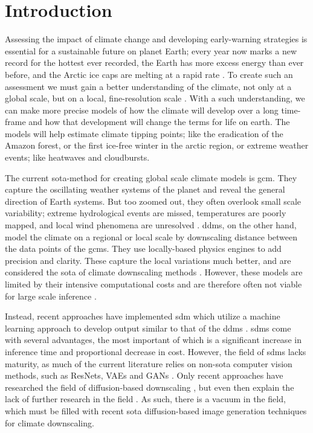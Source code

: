 \chapter{Introduction}
Assessing the impact of climate change and developing early-warning strategies is essential for a sustainable future on planet Earth; every year now marks a new record for the hottest ever recorded, the Earth has more excess energy than ever before, and the Arctic ice caps are melting at a rapid rate \cite{un-climate}. To create such an assessment we must gain a better understanding of the climate, not only at a global scale, but on a local, fine-resolution scale \cite{hclim-fennoscandinavia} \cite{precip-temp-downscaling-cnn} \cite{precip-downscaling} \cite{icyalert-article} \cite{review-ml-downscaling}. 
With a such understanding, we can make more precise models of how the climate will develop over a long time-frame and how that development will change the terms for life on earth. The models will help estimate climate tipping points; like the eradication of the Amazon forest, or the first ice-free winter in the arctic region, or extreme weather events; like heatwaves and cloudbursts. 

The current \gls{sota}-method for creating global scale climate models is \gls{gcm}. They capture the oscillating weather systems of the planet and reveal the general direction of Earth systems. But too zoomed out, they often overlook small scale variability; extreme hydrological events are missed, temperatures are poorly mapped, and local wind phenomena are unresolved \cite{precip-downscaling} \cite{temp-downscaling-rnn}. \Glspl{ddm}, on the other hand, model the climate on a regional or local scale by \gls{downscaling} distance between the data points of the \glspl{gcm}. They use locally-based physics engines to add precision and clarity. These capture the local variations much better, and are considered the \gls{sota} of climate \gls{downscaling} methods \cite{hclim-fennoscandinavia}. However, these models are limited by their intensive computational costs and are therefore often not viable for large scale inference \cite{precip-temp-downscaling-cnn}. 

Instead, recent approaches have implemented \gls{sdm} which utilize a machine learning approach to develop output similar to that of the \glspl{ddm} \cite{precip-temp-downscaling-cnn} \cite{tomasi} \cite{marie} \cite{dynamical-downscaling} \cite{review-ml-downscaling}. \Glspl{sdm} come with several advantages, the most important of which is a significant increase in inference time and proportional decrease in cost. However, the field of \glspl{sdm} lacks maturity, as much of the current literature relies on non-\gls{sota} computer vision methods, such as ResNets, VAEs and GANs \cite{review-ml-downscaling} \cite{review-ml-downscaling-resnet}. Only recent approaches have researched the field of diffusion-based \gls{downscaling} \cite{marie}, but even then explain the lack of further research in the field \cite{tomasi}. As such, there is a vacuum in the field, which must be filled with recent \gls{sota} diffusion-based image generation techniques for climate \gls{downscaling}.

